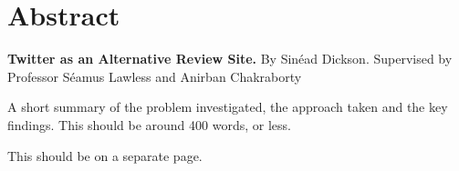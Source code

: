 \chapter*{Abstract}

\textbf{Twitter as an Alternative Review Site.} By Sinéad Dickson. Supervised by Professor Séamus Lawless and Anirban Chakraborty

A short summary of the problem investigated, the approach taken and the key findings. This should be around 400 words, or less.

This should be on a separate page.